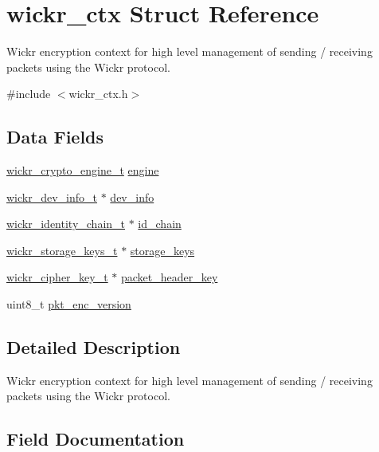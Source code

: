 \hypertarget{structwickr__ctx}{}\section{wickr\+\_\+ctx Struct Reference}
\label{structwickr__ctx}


Wickr encryption context for high level management of sending / receiving packets using the Wickr protocol.  




{\ttfamily \#include $<$wickr\+\_\+ctx.\+h$>$}

\subsection*{Data Fields}
\begin{DoxyCompactItemize}
\item 
\mbox{\hyperlink{structwickr__crypto__engine}{wickr\+\_\+crypto\+\_\+engine\+\_\+t}} \mbox{\hyperlink{structwickr__ctx_a244c238ad74f2dbcddc280822d1fb93f}{engine}}
\item 
\mbox{\hyperlink{structwickr__dev__info}{wickr\+\_\+dev\+\_\+info\+\_\+t}} $\ast$ \mbox{\hyperlink{structwickr__ctx_a043ea3b027c4d27909f77bb195550b11}{dev\+\_\+info}}
\item 
\mbox{\hyperlink{structwickr__identity__chain}{wickr\+\_\+identity\+\_\+chain\+\_\+t}} $\ast$ \mbox{\hyperlink{structwickr__ctx_a044a292ab5cbba50fd3ec2f5bf7a00ef}{id\+\_\+chain}}
\item 
\mbox{\hyperlink{structwickr__storage__keys}{wickr\+\_\+storage\+\_\+keys\+\_\+t}} $\ast$ \mbox{\hyperlink{structwickr__ctx_ab6d3ad69a6a16c0f582186b9d8461b66}{storage\+\_\+keys}}
\item 
\mbox{\hyperlink{structwickr__cipher__key}{wickr\+\_\+cipher\+\_\+key\+\_\+t}} $\ast$ \mbox{\hyperlink{structwickr__ctx_a86da8359c914b1fec0d60e1c64fcf048}{packet\+\_\+header\+\_\+key}}
\item 
uint8\+\_\+t \mbox{\hyperlink{structwickr__ctx_ad43117fbe3f70681f0ab982b06c6cd75}{pkt\+\_\+enc\+\_\+version}}
\end{DoxyCompactItemize}


\subsection{Detailed Description}
Wickr encryption context for high level management of sending / receiving packets using the Wickr protocol. 

\subsection{Field Documentation}
\mbox{\label{structwickr__ctx_a043ea3b027c4d27909f77bb195550b11}} 
